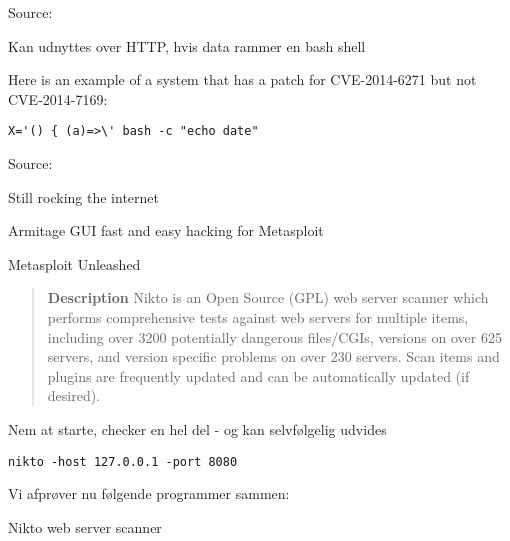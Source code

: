 \documentclass[20pt,landscape,a4paper,footrule]{foils}
\begin{document}


Source:

\centerline{Kan udnyttes over HTTP, hvis data rammer en bash shell}


Here is an example of a system that has a patch for CVE-2014-6271 but not CVE-2014-7169:



\verb+X='() { (a)=>\' bash -c "echo date"+

Source: 



\begin{list1}
\item Still rocking the internet\\
\item Armitage GUI fast and easy hacking for Metasploit\\
\item Metasploit Unleashed\\
\end{list1}




\centerline{}





\begin{quote}
{\bf Description}
Nikto is an Open Source (GPL) web server scanner which performs
comprehensive tests against web servers for multiple items, including
over 3200 potentially dangerous files/CGIs, versions on over 625
servers, and version specific problems on over 230 servers. Scan items
and plugins are frequently updated and can be automatically updated
(if desired).
\end{quote}

\begin{list1}
\item Nem at starte, checker en hel del - og kan selvfølgelig udvides
\item \verb+nikto -host 127.0.0.1 -port 8080+
\item Vi afprøver nu følgende programmer sammen:
\item Nikto web server scanner 
\end{list1}
\end{document}
